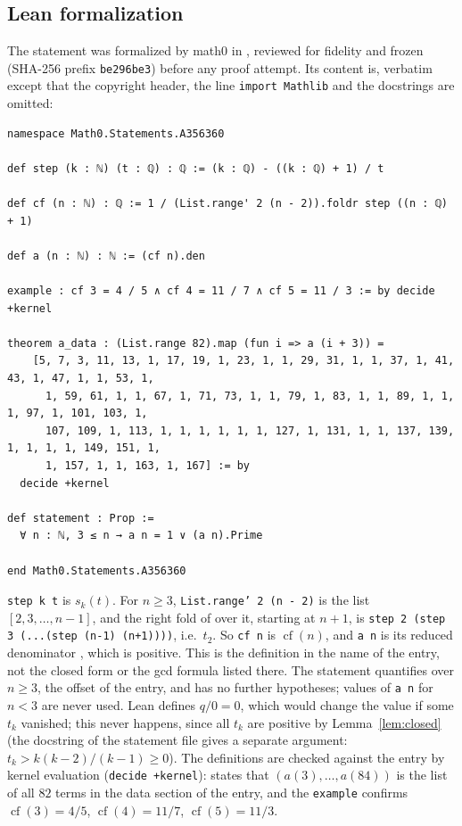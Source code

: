 \documentclass[11pt]{amsart}
\theoremstyle{plain}
\theoremstyle{definition}
\DeclareMathOperator{\cf}{cf}
\begin{document}
\subsection*{Lean formalization}
The statement was formalized by math0 in , reviewed for fidelity and frozen (SHA-256 prefix \texttt{be296be3}) before any proof attempt. Its content is, verbatim except that the copyright header, the line \texttt{import Mathlib} and the docstrings are omitted:
\begin{lstlisting}
namespace Math0.Statements.A356360

def step (k : ℕ) (t : ℚ) : ℚ := (k : ℚ) - ((k : ℚ) + 1) / t

def cf (n : ℕ) : ℚ := 1 / (List.range' 2 (n - 2)).foldr step ((n : ℚ) + 1)

def a (n : ℕ) : ℕ := (cf n).den

example : cf 3 = 4 / 5 ∧ cf 4 = 11 / 7 ∧ cf 5 = 11 / 3 := by decide +kernel

theorem a_data : (List.range 82).map (fun i => a (i + 3)) =
    [5, 7, 3, 11, 13, 1, 17, 19, 1, 23, 1, 1, 29, 31, 1, 1, 37, 1, 41, 43, 1, 47, 1, 1, 53, 1,
      1, 59, 61, 1, 1, 67, 1, 71, 73, 1, 1, 79, 1, 83, 1, 1, 89, 1, 1, 1, 97, 1, 101, 103, 1,
      107, 109, 1, 113, 1, 1, 1, 1, 1, 1, 127, 1, 131, 1, 1, 137, 139, 1, 1, 1, 1, 149, 151, 1,
      1, 157, 1, 1, 163, 1, 167] := by
  decide +kernel

def statement : Prop :=
  ∀ n : ℕ, 3 ≤ n → a n = 1 ∨ (a n).Prime

end Math0.Statements.A356360
\end{lstlisting}
\texttt{step k t} is $s_k(t)$. For $n\ge3$, \texttt{List.range' 2 (n - 2)} is the list $[2,3,\dots,n-1]$, and the right fold of  over it, starting at $n+1$, is \texttt{step 2 (step 3 (...(step (n-1) (n+1))))}, i.e.\ $t_2$. So \texttt{cf n} is $\cf(n)$, and \texttt{a n} is its reduced denominator , which is positive. This is the definition in the name of the entry, not the closed form or the gcd formula listed there. The statement quantifies over $n\ge3$, the offset of the entry, and has no further hypotheses; values of \texttt{a n} for $n<3$ are never used.
Lean defines $q/0=0$, which would change the value if some $t_k$ vanished; this never happens, since all $t_k$ are positive by Lemma~\ref{lem:closed} (the docstring of the statement file gives a separate argument: $t_k>k(k-2)/(k-1)\ge0$).
The definitions are checked against the entry by kernel evaluation (\texttt{decide +kernel}):  states that $(a(3),\dots,a(84))$ is the list of all $82$ terms in the data section of the entry, and the \texttt{example} confirms $\cf(3)=4/5$, $\cf(4)=11/7$, $\cf(5)=11/3$.
\end{document}

